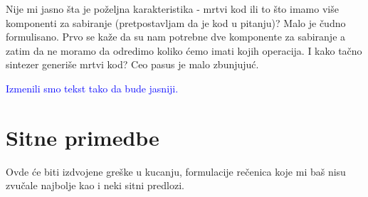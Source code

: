 \documentclass[a4paper]{report}
\newcommand{\odgovor}[1]{\textcolor{blue}{#1}}
\begin{document}
Nije mi jasno šta je poželjna karakteristika - mrtvi kod ili to što imamo više komponenti za sabiranje (pretpostavljam da je kod u pitanju)? Malo je čudno formulisano. Prvo se kaže da su nam potrebne dve komponente za sabiranje a zatim da ne moramo da odredimo koliko ćemo imati kojih operacija. I kako tačno sintezer generiše mrtvi kod? Ceo pasus je malo zbunjujuć.

\odgovor {Izmenili smo tekst tako da bude jasniji.}


\section{Sitne primedbe}
Ovde će biti izdvojene greške u kucanju, formulacije rečenica koje mi baš nisu zvučale najbolje kao i neki sitni predlozi.
\end{document}
